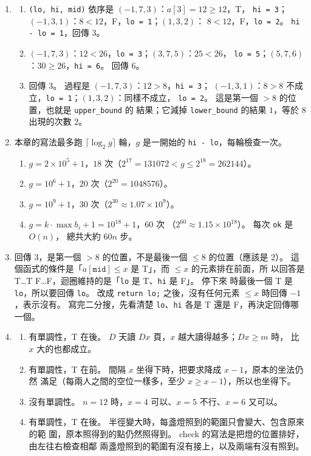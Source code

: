 \begin{enumerate}
\item
\begin{enumerate}
\item \texttt{(lo, hi, mid)} 依序是 $(-1, 7, 3)$：$a[3] = 12 \ge 12$，T，
\texttt{hi = 3}；$(-1, 3, 1)$：$8 < 12$，F，\texttt{lo = 1}；$(1, 3, 2)$：
$8 < 12$，F，\texttt{lo = 2}。 \texttt{hi - lo = 1}，回傳 $3$。
\item $(-1, 7, 3)$：$12 < 26$，\texttt{lo = 3}；$(3, 7, 5)$：$25 < 26$，
\texttt{lo = 5}；$(5, 7, 6)$：$30 \ge 26$，\texttt{hi = 6}。 回傳 $6$。
\item 回傳 $3$。 過程是 $(-1, 7, 3)$：$12 > 8$，\texttt{hi = 3}；
$(-1, 3, 1)$：$8 > 8$ 不成立，\texttt{lo = 1}；$(1, 3, 2)$：同樣不成立，
\texttt{lo = 2}。 這是第一個 $> 8$ 的位置，也就是 \texttt{upper\_bound} 的
結果；它減掉 \texttt{lower\_bound} 的結果 $1$，等於 $8$ 出現的次數 $2$。
\end{enumerate}

\item 本章的寫法最多跑 $\lceil \log_2 g \rceil$ 輪，$g$ 是一開始的
\texttt{hi - lo}，每輪檢查一次。
\begin{enumerate}
\item $g = 2 \times 10^5 + 1$，$18$ 次（$2^{17} = 131072 < g \le 2^{18} = 262144$）。
\item $g = 10^6 + 1$，$20$ 次（$2^{20} = 1048576$）。
\item $g = 10^9 + 1$，$30$ 次（$2^{30} \approx 1.07 \times 10^9$）。
\item $g = k \cdot \max b_i + 1 = 10^{18} + 1$，$60$ 次
（$2^{60} \approx 1.15 \times 10^{18}$）。 每次 \texttt{ok} 是 $O(n)$，
總共大約 $60n$ 步。
\end{enumerate}

\item 回傳 $3$，是第一個 $> 8$ 的位置，不是最後一個 $\le 8$ 的位置（應該是 $2$）。
這個函式的條件是「$a[\texttt{mid}] \le x$ 是 T」，而 $\le x$ 的元素排在前面，所
以回答是 T…T F…F，迴圈維持的是「\texttt{lo} 是 T、\texttt{hi} 是 F」。 停下來
時最後一個 T 是 \texttt{lo}，所以要回傳 \texttt{lo}。 改成 \texttt{return lo;}
之後，沒有任何元素 $\le x$ 時回傳 $-1$，表示沒有。 寫完二分搜，先看清楚
\texttt{lo}、\texttt{hi} 各是 T 還是 F，再決定回傳哪一個。

\item
\begin{enumerate}
\item 有單調性，T 在後。 $D$ 天讀 $Dx$ 頁，$x$ 越大讀得越多；$Dx \ge m$ 時，
比 $x$ 大的也都成立。
\item 有單調性，T 在前。 間隔 $x$ 坐得下時，把要求降成 $x - 1$，原本的坐法仍然
滿足（每兩人之間的空位一樣多，至少 $x \ge x - 1$），所以也坐得下。
\item 沒有單調性。 $n = 12$ 時，$x = 4$ 可以、$x = 5$ 不行、$x = 6$ 又可以。
\item 有單調性，T 在後。 半徑變大時，每盞燈照到的範圍只會變大、包含原來的範
圍，原本照得到的點仍然照得到。 check 的寫法是把燈的位置排好，由左往右檢查相鄰
兩盞燈照到的範圍有沒有接上，以及兩端有沒有照到。
\end{enumerate}


\end{enumerate}
